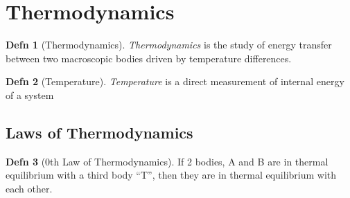 \documentclass[10pt,letterpaper,final,twoside,notitlepage]{article}
\numberwithin{equation}{section} %
\theoremstyle{definition}
\newtheorem{definition}{Defn} %
\theoremstyle{remark}
\begin{document}
\section{Thermodynamics} \label{sec:Thermo}
	\begin{definition}[Thermodynamics] \label{def:Thermo}
		\emph{Thermodynamics} is the study of energy transfer between two macroscopic bodies driven by temperature differences.
	\end{definition}
	\begin{definition}[Temperature] \label{def:Temperature}
		\emph{Temperature} is a direct measurement of internal energy of a system
	\end{definition}

	\subsection*{Laws of Thermodynamics} \label{subsec:Thermo Laws}
		\begin{definition}[0th Law of Thermodynamics] \label{def:0th Law of Thermo}
			If 2 bodies, A and B are in thermal equilibrium with a third body ``T'', then they are in thermal equilibrium with each other.
		\end{definition}
\end{document}
